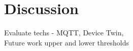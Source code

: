 \section{Discussion}
Evaluate techs - MQTT, Device Twin, 
\\Future work upper and lower thresholds





